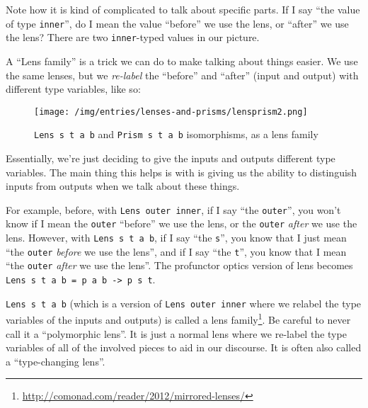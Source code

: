 \documentclass[]{article}
\renewcommand{\href}[2]{#2\footnote{\url{#1}}}
\begin{document}
Note how it is kind of complicated to talk about specific parts. If I say ``the
value of type \texttt{inner}'', do I mean the value ``before'' we use the lens,
or ``after'' we use the lens? There are two \texttt{inner}-typed values in our
picture.

A ``Lens family'' is a trick we can do to make talking about things easier. We
use the same lenses, but we \emph{re-label} the ``before'' and ``after'' (input
and output) with different type variables, like so:

\begin{figure}
\centering
\texttt{[image: /img/entries/lenses-and-prisms/lensprism2.png]}
\caption{\texttt{Lens\ s\ t\ a\ b} and \texttt{Prism\ s\ t\ a\ b} isomorphisms,
as a lens family}
\end{figure}

Essentially, we're just deciding to give the inputs and outputs different type
variables. The main thing this helps is with is giving us the ability to
distinguish inputs from outputs when we talk about these things.

For example, before, with \texttt{Lens\textquotesingle{}\ outer\ inner}, if I
say ``the \texttt{outer}'', you won't know if I mean the \texttt{outer}
``before'' we use the lens, or the \texttt{outer} \emph{after} we use the lens.
However, with \texttt{Lens\ s\ t\ a\ b}, if I say ``the \texttt{s}'', you know
that I just mean ``the \texttt{outer} \emph{before} we use the lens'', and if I
say ``the \texttt{t}'', you know that I mean ``the \texttt{outer} \emph{after}
we use the lens''. The profunctor optics version of lens becomes
\texttt{Lens\ s\ t\ a\ b\ =\ p\ a\ b\ -\textgreater{}\ p\ s\ t}.

\texttt{Lens\ s\ t\ a\ b} (which is a version of
\texttt{Lens\textquotesingle{}\ outer\ inner} where we relabel the type
variables of the inputs and outputs) is called a
\href{http://comonad.com/reader/2012/mirrored-lenses/}{lens family}. Be careful
to never call it a ``polymorphic lens''. It is just a normal lens where we
re-label the type variables of all of the involved pieces to aid in our
discourse. It is often also called a ``type-changing lens''.
\end{document}
